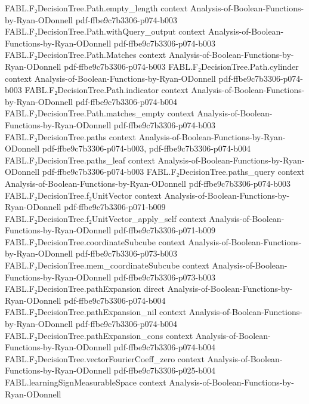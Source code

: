 \begin{theorem}
\proofstep
  {FABL.F₂DecisionTree.Path.empty_length}
  {context}
  {Analysis-of-Boolean-Functions-by-Ryan-ODonnell}
  {pdf-ffbe9c7b3306-p074-b003}
\proofstep
  {FABL.F₂DecisionTree.Path.withQuery_output}
  {context}
  {Analysis-of-Boolean-Functions-by-Ryan-ODonnell}
  {pdf-ffbe9c7b3306-p074-b003}
\proofstep
  {FABL.F₂DecisionTree.Path.Matches}
  {context}
  {Analysis-of-Boolean-Functions-by-Ryan-ODonnell}
  {pdf-ffbe9c7b3306-p074-b003}
\proofstep
  {FABL.F₂DecisionTree.Path.cylinder}
  {context}
  {Analysis-of-Boolean-Functions-by-Ryan-ODonnell}
  {pdf-ffbe9c7b3306-p074-b003}
\proofstep
  {FABL.F₂DecisionTree.Path.indicator}
  {context}
  {Analysis-of-Boolean-Functions-by-Ryan-ODonnell}
  {pdf-ffbe9c7b3306-p074-b004}
\proofstep
  {FABL.F₂DecisionTree.Path.matches_empty}
  {context}
  {Analysis-of-Boolean-Functions-by-Ryan-ODonnell}
  {pdf-ffbe9c7b3306-p074-b003}
\proofstep
  {FABL.F₂DecisionTree.paths}
  {context}
  {Analysis-of-Boolean-Functions-by-Ryan-ODonnell}
  {pdf-ffbe9c7b3306-p074-b003,
    pdf-ffbe9c7b3306-p074-b004}
\proofstep
  {FABL.F₂DecisionTree.paths_leaf}
  {context}
  {Analysis-of-Boolean-Functions-by-Ryan-ODonnell}
  {pdf-ffbe9c7b3306-p074-b003}
\proofstep
  {FABL.F₂DecisionTree.paths_query}
  {context}
  {Analysis-of-Boolean-Functions-by-Ryan-ODonnell}
  {pdf-ffbe9c7b3306-p074-b003}
\proofstep
  {FABL.F₂DecisionTree.f₂UnitVector}
  {context}
  {Analysis-of-Boolean-Functions-by-Ryan-ODonnell}
  {pdf-ffbe9c7b3306-p071-b009}
\proofstep
  {FABL.F₂DecisionTree.f₂UnitVector_apply_self}
  {context}
  {Analysis-of-Boolean-Functions-by-Ryan-ODonnell}
  {pdf-ffbe9c7b3306-p071-b009}
\proofstep
  {FABL.F₂DecisionTree.coordinateSubcube}
  {context}
  {Analysis-of-Boolean-Functions-by-Ryan-ODonnell}
  {pdf-ffbe9c7b3306-p073-b003}
\proofstep
  {FABL.F₂DecisionTree.mem_coordinateSubcube}
  {context}
  {Analysis-of-Boolean-Functions-by-Ryan-ODonnell}
  {pdf-ffbe9c7b3306-p073-b003}
\proofstep
  {FABL.F₂DecisionTree.pathExpansion}
  {direct}
  {Analysis-of-Boolean-Functions-by-Ryan-ODonnell}
  {pdf-ffbe9c7b3306-p074-b004}
\proofstep
  {FABL.F₂DecisionTree.pathExpansion_nil}
  {context}
  {Analysis-of-Boolean-Functions-by-Ryan-ODonnell}
  {pdf-ffbe9c7b3306-p074-b004}
\proofstep
  {FABL.F₂DecisionTree.pathExpansion_cons}
  {context}
  {Analysis-of-Boolean-Functions-by-Ryan-ODonnell}
  {pdf-ffbe9c7b3306-p074-b004}
\proofstep
  {FABL.F₂DecisionTree.vectorFourierCoeff_zero}
  {context}
  {Analysis-of-Boolean-Functions-by-Ryan-ODonnell}
  {pdf-ffbe9c7b3306-p025-b004}
\proofstep
  {FABL.learningSignMeasurableSpace}
  {context}
  {Analysis-of-Boolean-Functions-by-Ryan-ODonnell}

\end{theorem}
